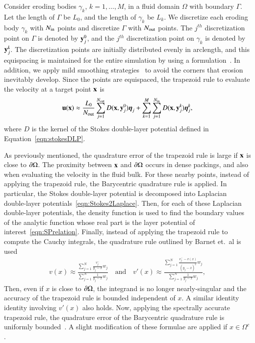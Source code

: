 \documentclass[preprint, 10pt]{elsarticle}
\begin{document}
Consider eroding bodies $\gamma_k$, $k=1,\ldots,M$, in a fluid domain
$\Omega$ with boundary $\Gamma$.  Let the length of $\Gamma$ be $L_{0}$,
and the length of $\gamma_k$ be $L_k$.  We discretize each eroding body
$\gamma_k$ with $N_{\mathrm{in}}$ points and discretize $\Gamma$ with $N_{\mathrm{out}}$
points.  The $j^{th}$ discretization point on $\Gamma$ is denoted by
${\mathbf{y}}_j^0$, and the $j^{th}$ discretization point on $\gamma_k$ is
denoted by ${\mathbf{y}}^k_j$.  The discretization points are initially
distributed evenly in arclength, and this equispacing is maintained for
the entire simulation by using a {\thL}
formulation~\cite{hou-low-she1994}.  In addition, we apply mild
smoothing strategies~\cite{qua-moo2018} to avoid the corners that
erosion inevitably develop.    Since the points are equispaced, the
trapezoid rule to evaluate the velocity at a target point ${\mathbf{x}}$ is
\begin{align}
  \label{eqn:trap}
  {\mathbf{u}}({\mathbf{x}}) \approx \frac{L_0}{N_{\mathrm{out}}} \sum_{j=1}^{N_{\mathrm{out}}} 
    D({\mathbf{x}},{\mathbf{y}}^0_j) {\boldsymbol\eta}_j +
  \sum_{k=1}^M \sum_{j=1}^{N_{\mathrm{in}}}
    D({\mathbf{x}},{\mathbf{y}}^k_j) {\boldsymbol\eta}^k_j,
\end{align}
where $D$ is the kernel of the Stokes double-layer potential defined in
Equation~\eqref{eqn:stokesDLP}.

As previously mentioned, the quadrature error of the trapezoid rule is
large if ${\mathbf{x}}$ is close to ${\partial}\Omega$.  The proximity between ${\mathbf{x}}$ and
${\partial}\Omega$ occurs in dense packings, and also when evaluating the
velocity in the fluid bulk.  For these nearby points, instead of
applying the trapezoid rule, the Barycentric quadrature rule is applied.
In particular, the Stokes double-layer potential is decomposed into
Laplacian double-layer potentials~\eqref{eqn:Stokes2Laplace}.  Then, for
each of these Laplacian double-layer potentials, the density function is
used to find the boundary values of the analytic function whose real
part is the layer potential of interest~\eqref{eqn:SPrelation}.
Finally, instead of applying the trapezoid rule to compute the Cauchy
integrals, the quadrature rule outlined by Barnet et.~al is used
\begin{align}
  v(x) \approx \frac{\sum\limits_{j=1}^N \frac{v_j^-}{y_j-x}w_j}
    {\sum\limits_{j=1}^N \frac{1}{y_j-x}w_j}
  \quad \text{and} \quad
  v'(x) \approx \frac{\sum\limits_{j=1}^N 
    \frac{v_j^- - v(x)}{(y_j - x)^2}w_j}
    {\sum\limits_{j=1}^N \frac{1}{y_j-x}w_j}, 
  \label{eqn:vvpQuadrature}
\end{align}
Then, even if $x$ is close to ${\partial}\Omega$, the integrand is no longer
nearly-singular and the accuracy of the trapezoid rule is bounded
independent of $x$.  A similar identity identity involving $v'(x)$ also
holds.   Now, applying the spectrally accurate trapezoid rule, the
quadrature error of the Barycentric quadrature rule
is uniformly bounded~\cite{bar-wu-vee2015}.  A slight modification of
these formulae are applied if $x \in \Omega^{c}$.
\end{document}
